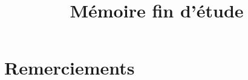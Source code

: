 \documentclass[french, a4paper, 12pt]{report}
\title{Mémoire fin d'étude }
\begin{document}





%



\tableofcontents
\chapter*{Remerciements}
\end{document}
